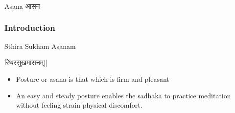 \begin{frame}[fragile]\frametitle{}
\begin{center}
{\Large Asana आसन}
\end{center}
\end{frame}


\begin{frame}[fragile]\frametitle{Introduction}

Sthira Sukham Asanam

स्थिरसुखमासनम्||

	\begin{itemize}
	\item Posture or asana is that which 
is firm and pleasant
	\item An easy 
and  steady  posture  enables 
the  sadhaka  to  practice 
meditation  without  feeling 
strain physical discomfort.
	\end{itemize}

\end{frame}

